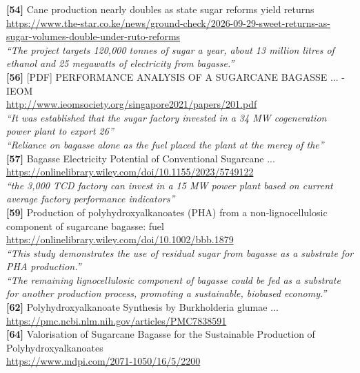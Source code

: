 \textbf{[54]} Cane production nearly doubles as state sugar reforms yield returns\\[0.15em]
\url{https://www.the-star.co.ke/news/ground-check/2026-09-29-sweet-returns-as-sugar-volumes-double-under-ruto-reforms}\\[0.2em]
\emph{``The project targets 120,000 tonnes of sugar a year, about 13 million litres of ethanol and 25 megawatts of electricity from bagasse.''}\\[0.45em]

\textbf{[56]} [PDF] PERFORMANCE ANALYSIS OF A SUGARCANE BAGASSE ... - IEOM\\[0.15em]
\url{http://www.ieomsociety.org/singapore2021/papers/201.pdf}\\[0.2em]
\emph{``It was established that the sugar factory invested in a 34 MW cogeneration power plant to export 26''}\\[0.45em]
\emph{``Reliance on bagasse alone as the fuel placed the plant at the mercy of the''}\\[0.45em]

\textbf{[57]} Bagasse Electricity Potential of Conventional Sugarcane ...\\[0.15em]
\url{https://onlinelibrary.wiley.com/doi/10.1155/2023/5749122}\\[0.2em]
\emph{``the 3,000 TCD factory can invest in a 15 MW power plant based on current average factory performance indicators''}\\[0.45em]

\textbf{[59]} Production of polyhydroxyalkanoates (PHA) from a non‐lignocellulosic component of sugarcane bagasse: fuel\\[0.15em]
\url{https://onlinelibrary.wiley.com/doi/10.1002/bbb.1879}\\[0.2em]
\emph{``This study demonstrates the use of residual sugar from bagasse as a substrate for PHA production.''}\\[0.45em]
\emph{``The remaining lignocellulosic component of bagasse could be fed as a substrate for another production process, promoting a sustainable, biobased economy.''}\\[0.45em]

\textbf{[62]} Polyhydroxyalkanoate Synthesis by Burkholderia glumae ...\\[0.15em]
\url{https://pmc.ncbi.nlm.nih.gov/articles/PMC7838591}\\[0.2em]

\textbf{[64]} Valorisation of Sugarcane Bagasse for the Sustainable Production of Polyhydroxyalkanoates\\[0.15em]
\url{https://www.mdpi.com/2071-1050/16/5/2200}\\[0.2em]

